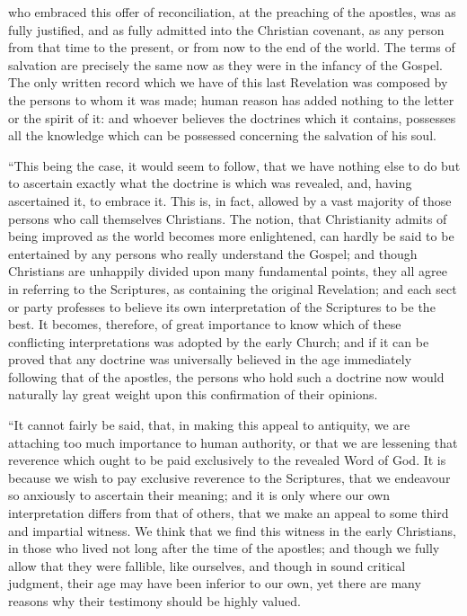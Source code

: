 who embraced this offer
of reconciliation, at the preaching of the apostles, was as fully
justified, and as fully admitted into the Christian covenant, as any
person from that time to the present, or from now to the end of the
world. The terms of salvation are precisely the same now as they were in
the infancy of the Gospel. The only written record which we have of this
last Revelation was composed by the persons to whom it was made; human
reason has added nothing to the letter or the spirit of it: and whoever
believes the doctrines which it contains, possesses all the knowledge
which can be possessed concerning the salvation of his soul.

``This
being the case, it would seem to follow, that we have nothing else to do
but to ascertain exactly what the doctrine is which was revealed, and,
having ascertained it, to embrace it. This is, in fact, allowed by a
vast majority of those persons who call themselves Christians. The
notion, that Christianity admits of being improved as the world becomes
more enlightened, can hardly be said to be entertained by any persons
who really understand the Gospel; and though Christians are unhappily
divided upon many fundamental points, they all agree in referring to the
Scriptures, as containing the original Revelation; and each sect or
party professes to believe its own interpretation of the Scriptures to
be the best. It becomes, therefore, of great importance to know which of
these conflicting interpretations was adopted by the early Church; and
if it can be proved that any doctrine was universally believed in the
age immediately following that of the apostles, the persons who hold
such a doctrine now would naturally lay great weight upon this
confirmation of their opinions.

``It
cannot fairly be said, that, in making this appeal to antiquity, we are
attaching too much importance to human authority, or that we are
lessening that reverence which ought to be paid exclusively to the
revealed Word of God. It is because we wish to pay exclusive reverence
to the Scriptures, that we endeavour so anxiously to ascertain their
meaning; and it is only where our own interpretation differs from that
of others, that we make an appeal to some third and impartial witness.
We think that we find this witness in the early Christians, in those who
lived not long after the time of the apostles; and though we fully allow
that they were fallible, like ourselves, and though in sound critical
judgment, their age may have been inferior to our own, yet there are
many reasons why their testimony should be highly valued.

